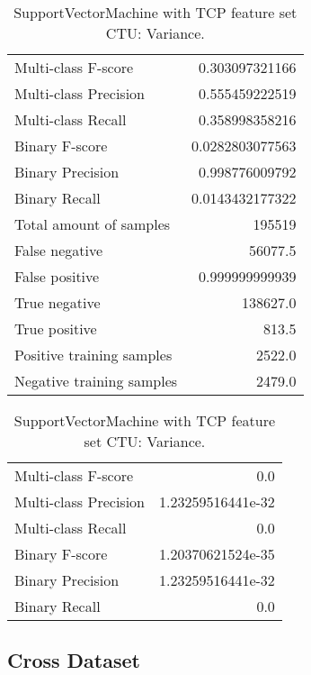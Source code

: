 \begin{table}[H]
\begin{minipage}{0.5\textwidth}
\caption{SupportVectorMachine with TCP feature set CTU: Average.}
\centering
\begin{tabular}{l r}
\toprule
Multi-class F-score & 0.303097321166 \\
Multi-class Precision & 0.555459222519 \\
Multi-class Recall & 0.358998358216 \\
\midrule
Binary F-score & 0.0282803077563 \\
Binary Precision & 0.998776009792 \\
Binary Recall & 0.0143432177322 \\
\midrule
Total amount of samples & 195519 \\
False negative & 56077.5 \\
False positive & 0.999999999939 \\
True negative & 138627.0 \\
True positive & 813.5 \\
\midrule
Positive training samples & 2522.0 \\
Negative training samples & 2479.0 \\
\bottomrule
\end{tabular}
\end{minipage}
\hfillx
\begin{minipage}{0.5\textwidth}
\caption{SupportVectorMachine with TCP feature set CTU: Variance.}
\centering
\begin{tabular}{l r}
\toprule
Multi-class F-score & 0.0 \\
Multi-class Precision & 1.23259516441e-32 \\
Multi-class Recall & 0.0 \\
\midrule
Binary F-score & 1.20370621524e-35 \\
Binary Precision & 1.23259516441e-32 \\
Binary Recall & 0.0 \\
\bottomrule
\end{tabular}
\end{minipage}
\end{table}


\newpage
\subsection{Cross Dataset}

